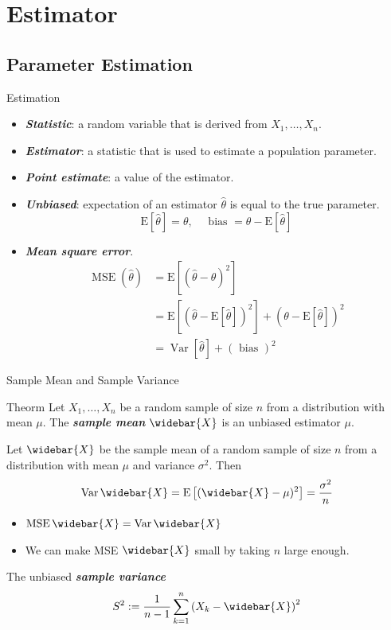 \documentclass{beamer}
\newcommand{\bb}[1]{\textcolor{antiquefuchsia}{\textbf{\textit{#1}}}}
\begin{document}
\section{Estimator}
\subsection{Parameter Estimation}
\begin{frame}{Estimation}
\begin{itemize}
\item \bb{Statistic}: a random variable that is derived from $X_{1}, \ldots, X_{n}$.
\item \bb{Estimator}: a statistic that is used to estimate a population parameter.
\item \bb{Point estimate}: a value of the estimator.
\item \bb{Unbiased}: expectation of an estimator $\widehat{\theta}$ is equal to the true parameter.
$$
\mathrm{E}[\widehat{\theta}]=\theta, \quad \text { bias }=\theta-\mathrm{E}[\widehat{\theta}]
$$
\item \bb{Mean square error}.
$$
\begin{aligned}
\operatorname{MSE}(\widehat{\theta}) &=\mathrm{E}\left[(\widehat{\theta}-\theta)^{2}\right] \\
&=\mathrm{E}\left[(\widehat{\theta}-\mathrm{E}[\widehat{\theta}])^{2}\right]+(\theta-\mathrm{E}[\widehat{\theta}])^{2} \\
&=\operatorname{Var}[\widehat{\theta}]+(\text { bias })^{2}
\end{aligned}
$$
\end{itemize}
\end{frame}

\begin{frame}{Sample Mean and Sample Variance}
\begin{block}{Theorm} 
Let $X_{1}, \ldots, X_{n}$ be a random sample of size $n$ from a distribution with mean $\mu$. The \bb{sample mean} $\widebar{X}$ is an unbiased estimator $\mu$.

Let $\widebar{X}$ be the sample mean of a random sample of size $n$ from a distribution with mean $\mu$ and variance $\sigma^{2}$. Then
$$
\operatorname{Var} \widebar{X}=\mathrm{E}\left[(\widebar{X}-\mu)^{2}\right]=\frac{\sigma^{2}}{n}
$$
\begin{itemize}
\item $\operatorname{MSE} \widebar{X}=\operatorname{Var} \widebar{X}$
\item We can make MSE $\widebar{X}$ small by taking $n$ large enough.
\end{itemize}
\end{block}
The unbiased \bb{sample variance}
$$
S^{2}:=\frac{1}{n-1} \sum_{k=1}^{n}\left(X_{k}-\widebar{X}\right)^{2}
$$
\end{frame}
\end{document}
